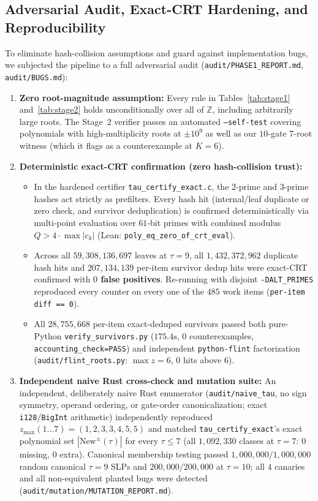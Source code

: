 \documentclass[11pt]{article}
\newcommand{\Z}{\mathbb{Z}}
\newcommand{\code}[1]{\texttt{#1}}
\newcommand{\zmax}{z_{\max}}
\begin{document}
\subsection{Adversarial Audit, Exact-CRT Hardening, and Reproducibility}
To eliminate hash-collision assumptions and guard against implementation bugs, we subjected the pipeline to a full adversarial audit (\code{audit/PHASE1\_REPORT.md}, \code{audit/BUGS.md}):
\begin{enumerate}[label=(\arabic*),leftmargin=1.8em]
  \item \textbf{Zero root-magnitude assumption:} Every rule in Tables~\ref{tab:stage1} and~\ref{tab:stage2} holds unconditionally over all of $\Z$, including arbitrarily large roots. The Stage~2 verifier passes an automated \code{--self-test} covering polynomials with high-multiplicity roots at $\pm 10^9$ as well as our $10$-gate $7$-root witness (which it flags as a counterexample at $K = 6$).
  \item \textbf{Deterministic exact-CRT confirmation (zero hash-collision trust):}
  \begin{itemize}[leftmargin=1.5em]
    \item In the hardened certifier \code{tau\_certify\_exact.c}, the $2$-prime and $3$-prime hashes act strictly as prefilters. Every hash hit (internal/leaf duplicate or zero check, and survivor deduplication) is confirmed deterministically via multi-point evaluation over $61$-bit primes with combined modulus $Q > 4 \cdot \max |c_k|$ (Lean: \code{poly\_eq\_zero\_of\_crt\_eval}).
    \item Across all $59{,}308{,}136{,}697$ leaves at $\tau = 9$, all $1{,}432{,}372{,}962$ duplicate hash hits and $207{,}134{,}139$ per-item survivor dedup hits were exact-CRT confirmed with \textbf{$0$ false positives}. Re-running with disjoint \code{-DALT\_PRIMES} reproduced every counter on every one of the $485$ work items (\code{per-item diff == 0}).
    \item All $28{,}755{,}668$ per-item exact-deduped survivors passed both pure-Python \code{verify\_survivors.py} ($175.4\text{s}$, $0$ counterexamples, \code{accounting\_check=PASS}) and independent \code{python-flint} factorization (\code{audit/flint\_roots.py}: $\max z = 6$, $0$ hits above $6$).
  \end{itemize}
  \item \textbf{Independent naive Rust cross-check and mutation suite:} An independent, deliberately naive Rust enumerator (\code{audit/naive\_tau}, no sign symmetry, operand ordering, or gate-order canonicalization; exact \code{i128}/\code{BigInt} arithmetic) independently reproduced $\zmax(1 \dots 7) = (1, 2, 3, 3, 4, 5, 5)$ and matched \code{tau\_certify\_exact}'s exact polynomial set $|\mathrm{New}^\pm(\tau)|$ for every $\tau \le 7$ (all $1{,}092{,}330$ classes at $\tau = 7$: $0$ missing, $0$ extra). Canonical membership testing passed $1{,}000{,}000 / 1{,}000{,}000$ random canonical $\tau = 9$ SLPs and $200{,}000 / 200{,}000$ at $\tau = 10$; all $4$ canaries and all non-equivalent planted bugs were detected (\code{audit/mutation/MUTATION\_REPORT.md}).

\end{enumerate}
\end{document}
